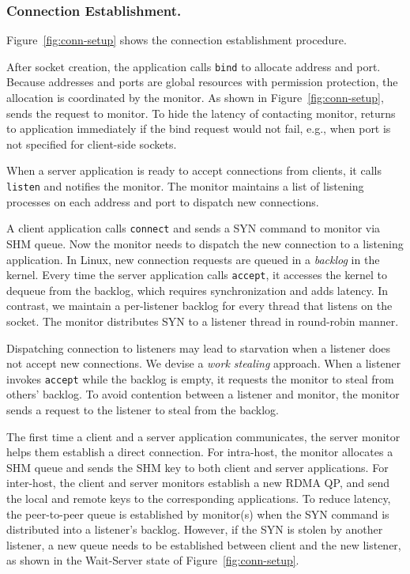 \subsubsection{Connection Establishment.}
\quad

Figure~\ref{fig:conn-setup} shows the connection establishment procedure.

After socket creation, the application calls \texttt{bind} to allocate address and port.
Because addresses and ports are global resources with permission protection, the allocation is coordinated by the monitor.
As shown in Figure~\ref{fig:conn-setup}, \libipc{} sends the request to monitor.
To hide the latency of contacting monitor, \libipc{} returns to application immediately if the bind request would not fail, e.g., when port is not specified for client-side sockets.

When a server application is ready to accept connections from clients, it calls \texttt{listen} and notifies the monitor.
The monitor maintains a list of listening processes on each address and port to dispatch new connections.


A client application calls \texttt{connect} and sends a SYN command to monitor via SHM queue.
Now the monitor needs to dispatch the new connection to a listening application.
In Linux, new connection requests are queued in a \emph{backlog} in the kernel.
Every time the server application calls \texttt{accept}, it accesses the kernel to dequeue from the backlog, which requires synchronization and adds latency.
In contrast, we maintain a per-listener backlog for every thread that listens on the socket.
The monitor distributes SYN to a listener thread in round-robin manner.

Dispatching connection to listeners may lead to starvation when a listener does not accept new connections.
We devise a \emph{work stealing} approach.
When a listener invokes \texttt{accept} while the backlog is empty, it requests the monitor to steal from others' backlog.
To avoid contention between a listener and monitor, the monitor sends a request to the listener to steal from the backlog.

The first time a client and a server application communicates, the server monitor helps them establish a direct connection.
For intra-host, the monitor allocates a SHM queue and sends the SHM key to both client and server applications.
For inter-host, the client and server monitors establish a new RDMA QP, and send the local and remote keys to the corresponding applications.
To reduce latency, the peer-to-peer queue is established by monitor(s) when the SYN command is distributed into a listener's backlog.
However, if the SYN is stolen by another listener, a new queue needs to be established between client and the new listener, as shown in the Wait-Server state of Figure~\ref{fig:conn-setup}.


